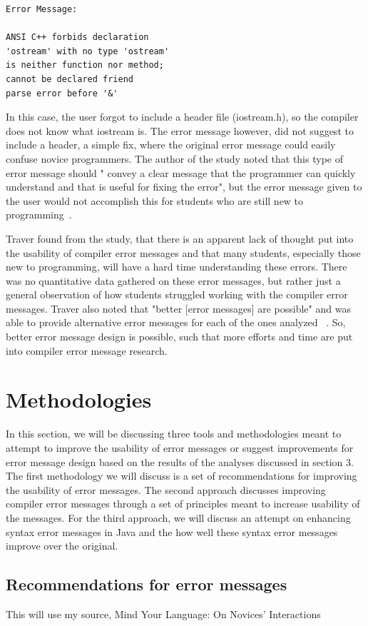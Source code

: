 \documentclass{sig-alternate}
\begin{document}
\begin{verbatim}
Error Message:

ANSI C++ forbids declaration 
'ostream' with no type 'ostream'
is neither function nor method; 
cannot be declared friend
parse error before '&'
\end{verbatim}

In this case, the user forgot to include a header file (iostream.h), so the compiler does not know what iostream is. The error message however, did not suggest to include a header, a simple fix, where the original error message could easily confuse novice programmers. The author of the study noted that this type of error message should " convey a clear message that the programmer can quickly understand and that is useful for fixing the error", but the error message given to the user would not accomplish this for students who are still new to programming~\cite{Traver:2010}.

Traver found from the study, that there is an apparent lack of thought put into the usability of compiler error messages and that many students, especially those new to programming, will have a hard time understanding these errors. There was no quantitative data gathered on these error messages, but rather just a general observation of how students struggled working with the compiler error messages. Traver also noted that "better [error messages] are possible" and was able to provide alternative error messages for each of the ones analyzed ~\cite{Traver:2010}. So, better error message design is possible, such that more efforts and time are put into compiler error message research. 

\section{Methodologies}
In this section, we will be discussing three tools and methodologies meant to attempt to improve the usability of error messages or suggest improvements for error message design based on the results of the analyses discussed in section 3. The first methodology we will discuss is a set of recommendations for improving the usability of error messages. The second approach discusses improving compiler error messages through a set of principles meant to increase usability of the messages. For the third approach, we will discuss an attempt on enhancing syntax error messages in Java and the how well these syntax error messages improve over the original. 

\subsection{Recommendations for error messages}
This will use my source, Mind Your Language: On Novices' Interactions 
\end{document}
